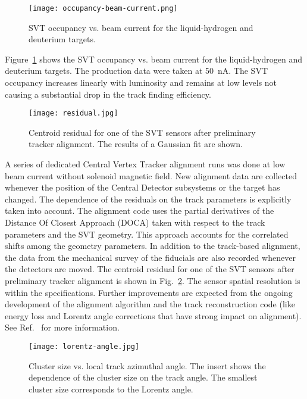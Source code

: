 \begin{figure}[hbt] 
\centering 
\texttt{[image: occupancy-beam-current.png]}
\caption{SVT occupancy vs. beam current for the liquid-hydrogen and deuterium targets.}
\label{fig:occupancy-beam-current}
\end{figure}

Figure~\ref{fig:occupancy-beam-current} shows the SVT occupancy vs. beam current for the liquid-hydrogen and
deuterium targets. The production data were taken at 50~nA. The SVT occupancy increases linearly with luminosity
and remains at low levels not causing a substantial drop in the track finding efficiency.

\begin{figure}[hbt] 
\centering 
\texttt{[image: residual.jpg]}
\caption{Centroid residual for one of the SVT sensors after preliminary tracker alignment. The results of a
  Gaussian fit are shown.}
\label{fig:residual}
\end{figure}

A series of dedicated Central Vertex Tracker alignment runs was done at low beam current without solenoid
magnetic field. New alignment data are collected whenever the position of the Central Detector subsystems or
the target has changed. The dependence of the residuals on the track parameters is explicitly taken into account.
The alignment code uses the partial derivatives of the Distance Of Closest Approach (DOCA) taken with respect
to the track parameters and the SVT geometry. This approach accounts for the correlated shifts among the
geometry parameters. In addition to the track-based alignment, the data from the mechanical survey of the
fiducials are also recorded whenever the detectors are moved. The centroid residual for one of the SVT sensors
after preliminary tracker alignment is shown in Fig.~\ref{fig:residual}. The sensor spatial resolution is within the
specifications. Further improvements are expected from the ongoing development of the alignment algorithm and
the track reconstruction code (like energy loss and Lorentz angle corrections that have strong impact on alignment).
See Ref.~\cite{recon-nim} for more information.

\begin{figure}[hbt] 
\centering 
\texttt{[image: lorentz-angle.jpg]}
\caption{Cluster size vs. local track azimuthal angle. The insert shows the dependence of the cluster size on the
  track angle. The smallest cluster size corresponds to the Lorentz angle.}
\label{fig:lorentz-angle}
\end{figure}

